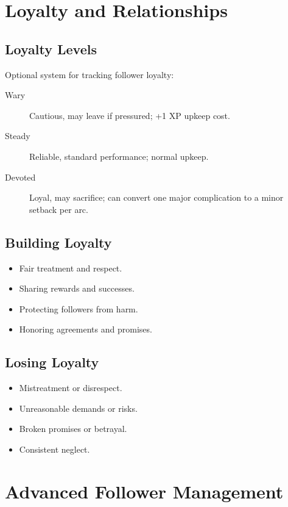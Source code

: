 \begin{multicols}{2}
\section{Loyalty and Relationships}

\subsection*{Loyalty Levels}
Optional system for tracking follower loyalty:
\begin{description}
\item[Wary] Cautious, may leave if pressured; +1 XP upkeep cost.
\item[Steady] Reliable, standard performance; normal upkeep.
\item[Devoted] Loyal, may sacrifice; can convert one major complication to a minor setback per arc.
\end{description}

\subsection*{Building Loyalty}
\begin{itemize}
\item Fair treatment and respect.
\item Sharing rewards and successes.
\item Protecting followers from harm.
\item Honoring agreements and promises.
\end{itemize}

\subsection*{Losing Loyalty}
\begin{itemize}
\item Mistreatment or disrespect.
\item Unreasonable demands or risks.
\item Broken promises or betrayal.
\item Consistent neglect.
\end{itemize}

\section{Advanced Follower Management}


\end{multicols}
